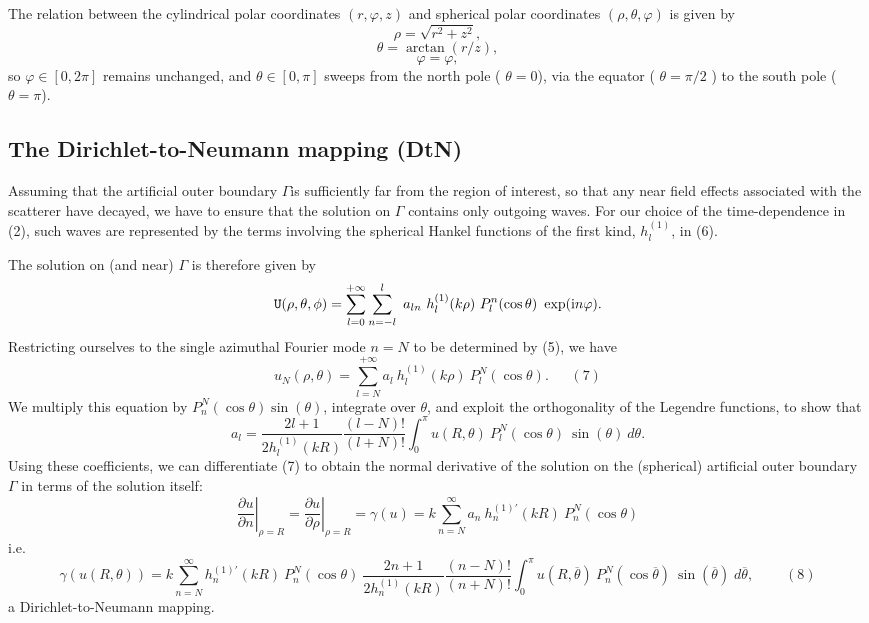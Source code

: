 The relation between the cylindrical polar coordinates $ (r,\varphi,z)$ and spherical polar coordinates $ (\rho,\theta,\varphi) $ is given by \[ \rho = \sqrt{r^2 + z^2}, \] \[ \theta = \arctan(r/z), \] \[ \varphi = \varphi, \] so $\varphi \in [0,2\pi] $ remains unchanged, and $\theta \in [0,\pi] $ sweeps from the north pole ( $ \theta = 0 $), via the equator ( $ \theta = \pi/2 $ ) to the south pole ( $ \theta = \pi $).\hypertarget{index_DtN}{}\subsection{The Dirichlet-\/to-\/\+Neumann mapping (\+Dt\+N)}\label{index_DtN}
Assuming that the artificial outer boundary $ \Gamma $is sufficiently far from the region of interest, so that any near field effects associated with the scatterer have decayed, we have to ensure that the solution on $ \Gamma $ contains only outgoing waves. For our choice of the time-\/dependence in (2), such waves are represented by the terms involving the spherical Hankel functions of the first kind, $ h_l^{(1)} $, in (6).

The solution on (and near) $ \Gamma $ is therefore given by \[ {\tt U}(\rho,\theta,\phi)= \sum_{l=0}^{+\infty}\sum_{n=-l}^{l} \ a_{ln}\ h_{l}^{(1)}(k\rho) \ P_{l}^{n}(\cos\theta) \ \exp({\rm i}n\varphi). \] Restricting ourselves to the single azimuthal Fourier mode $ n=N $ to be determined by (5), we have \[ u_N(\rho,\theta)=\sum_{l=N}^{+\infty} a_{l} \ h_{l}^{(1)}(k\rho)\ P_{l}^{N}(\cos\theta). \ \ \ \ \ \ \ (7) \] We multiply this equation by $ P_{n}^{N}(\cos\theta) \sin(\theta)$, integrate over $ \theta $, and exploit the orthogonality of the Legendre functions, to show that \[ a_{l}=\frac{2l+1}{2 h_{l}^{(1)}(kR)} \frac{(l-N)!}{(l+N)!}\int_{0}^{\pi} u(R,\theta)\ P_{l}^{N}(\cos\theta) \ \sin(\theta) \ d\theta. \] Using these coefficients, we can differentiate (7) to obtain the normal derivative of the solution on the (spherical) artificial outer boundary $ \Gamma $ in terms of the solution itself\+: \[ \left. \frac{\partial u}{\partial n} \right|_{\rho=R} = \left. \frac{\partial u}{\partial \rho} \right|_{\rho=R} = \gamma(u) = k\sum_{n=N}^{\infty}a_{n} \ h_{n}^{(1)'}(kR)\ P_{n}^{N}(\cos \theta) \] i.\+e. \[ \gamma(u(R,\theta))= k \sum_{n=N}^{\infty} h_{n}^{(1)'}(kR) \ P_{n}^{N}(\cos \theta) \ \frac{2n+1}{2h_{n}^{(1)}(kR)}\frac{(n-N)!}{(n+N)!} \int_{0}^{\pi} u(R,\overline{\theta}) \ P_{n}^{N}(\cos\overline{\theta}) \ \sin(\overline{\theta}) \; d\overline{\theta}, \ \ \ \ \ \ \ \ \ \ (8) \] a Dirichlet-\/to-\/\+Neumann mapping.

